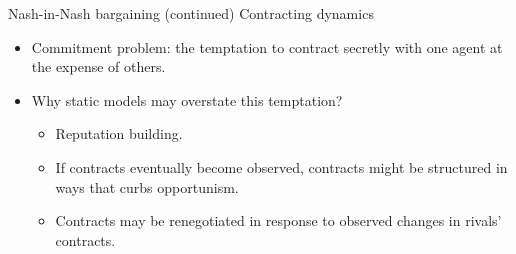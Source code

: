 \documentclass[aspectratio=169]{beamer}  %
\begin{document}
\begin{frame}{Nash-in-Nash bargaining (continued)}
    Contracting dynamics \vspace{.2cm}
    \begin{itemize}
        \item Commitment problem: the temptation to contract secretly with one agent at the expense of others. \vspace{.2cm}
        \item Why static models may overstate this temptation? \vspace{.2cm}
        \begin{itemize}
            \item Reputation building. \vspace{.2cm}
            \item If contracts eventually become observed, contracts might be
            structured in ways that curbs opportunism. \vspace{.2cm}
            \item Contracts may be renegotiated in response to observed changes in rivals' contracts.
        \end{itemize}
    \end{itemize}
\end{frame}
\end{document}
